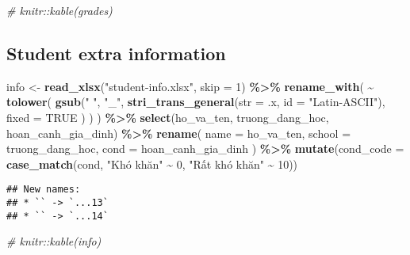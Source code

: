 \documentclass[
]{article}
\newenvironment{Shaded}{\begin{snugshade}}{\end{snugshade}}
\newcommand{\AttributeTok}[1]{\textcolor[rgb]{0.13,0.29,0.53}{#1}}
\newcommand{\CommentTok}[1]{\textcolor[rgb]{0.56,0.35,0.01}{\textit{#1}}}
\newcommand{\ConstantTok}[1]{\textcolor[rgb]{0.56,0.35,0.01}{#1}}
\newcommand{\DecValTok}[1]{\textcolor[rgb]{0.00,0.00,0.81}{#1}}
\newcommand{\FunctionTok}[1]{\textcolor[rgb]{0.13,0.29,0.53}{\textbf{#1}}}
\newcommand{\NormalTok}[1]{#1}
\newcommand{\OtherTok}[1]{\textcolor[rgb]{0.56,0.35,0.01}{#1}}
\newcommand{\SpecialCharTok}[1]{\textcolor[rgb]{0.81,0.36,0.00}{\textbf{#1}}}
\newcommand{\StringTok}[1]{\textcolor[rgb]{0.31,0.60,0.02}{#1}}
\begin{document}
\begin{Shaded}
\begin{Highlighting}[]
\CommentTok{\# knitr::kable(grades)}
\end{Highlighting}
\end{Shaded}

\hypertarget{student-extra-information}{%
\subsection{Student extra information}\label{student-extra-information}}

\begin{Shaded}
\begin{Highlighting}[]
\NormalTok{info }\OtherTok{\textless{}{-}} \FunctionTok{read\_xlsx}\NormalTok{(}\StringTok{"student{-}info.xlsx"}\NormalTok{, }\AttributeTok{skip =} \DecValTok{1}\NormalTok{) }\SpecialCharTok{\%\textgreater{}\%}
  \FunctionTok{rename\_with}\NormalTok{(}
    \SpecialCharTok{\textasciitilde{}} \FunctionTok{tolower}\NormalTok{(}
      \FunctionTok{gsub}\NormalTok{(}\StringTok{" "}\NormalTok{, }\StringTok{"\_"}\NormalTok{,}
        \FunctionTok{stri\_trans\_general}\NormalTok{(}\AttributeTok{str =}\NormalTok{ .x, }\AttributeTok{id =} \StringTok{"Latin{-}ASCII"}\NormalTok{),}
        \AttributeTok{fixed =} \ConstantTok{TRUE}
\NormalTok{      )}
\NormalTok{    )}
\NormalTok{  ) }\SpecialCharTok{\%\textgreater{}\%}
  \FunctionTok{select}\NormalTok{(ho\_va\_ten, truong\_dang\_hoc, hoan\_canh\_gia\_dinh) }\SpecialCharTok{\%\textgreater{}\%}
  \FunctionTok{rename}\NormalTok{(}
    \AttributeTok{name =}\NormalTok{ ho\_va\_ten,}
    \AttributeTok{school =}\NormalTok{ truong\_dang\_hoc,}
    \AttributeTok{cond =}\NormalTok{ hoan\_canh\_gia\_dinh}
\NormalTok{  ) }\SpecialCharTok{\%\textgreater{}\%}
  \FunctionTok{mutate}\NormalTok{(}\AttributeTok{cond\_code =} \FunctionTok{case\_match}\NormalTok{(cond, }\StringTok{"Khó khăn"} \SpecialCharTok{\textasciitilde{}} \DecValTok{0}\NormalTok{, }\StringTok{"Rất khó khăn"} \SpecialCharTok{\textasciitilde{}} \DecValTok{10}\NormalTok{))}
\end{Highlighting}
\end{Shaded}

\begin{verbatim}
## New names:
## * `` -> `...13`
## * `` -> `...14`
\end{verbatim}

\begin{Shaded}
\begin{Highlighting}[]
\CommentTok{\# knitr::kable(info)}
\end{Highlighting}
\end{Shaded}
\end{document}
